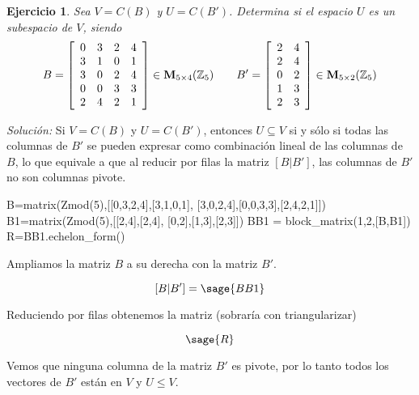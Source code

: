 \documentclass{amsart}
\newtheorem{ejer}{Ejercicio}
\begin{document}

\begin{ejer} Sea $V = C(B)$ y $U = C(B')$. Determina si el espacio $U$ es un subespacio de $V$, siendo 
\[B = \left[\begin{array}{rrrrr}
0 & 3 & 2 & 4 \\
3 & 1 & 0 & 1 \\
3 & 0 & 2 & 4 \\
0 & 0 & 3 & 3 \\
2 & 4 & 2 & 1
\end{array}\right] \in {\bf M}_{5 \times 4}({\mathbb Z}_{5}) \qquad
B' = \left[\begin{array}{rrrrr}
2 & 4 \\
2 & 4 \\
0 & 2 \\
1 & 3 \\
2 & 3
\end{array}\right] \in {\bf M}_{5 \times 2}({\mathbb Z}_{5}) \]
\end{ejer}

{\it Soluci\'on:}
Si $V=C(B)$ y $U=C(B')$, entonces $U\subseteq V$ si y sólo si todas las columnas 
de $B'$ se pueden expresar como combinación lineal de las columnas de $B$, lo 
que equivale a que al reducir por filas la matriz $[B|B']$, las columnas de $B'$ 
no son columnas pivote.

\begin{sageblock}
B=matrix(Zmod(5),[[0,3,2,4],[3,1,0,1],
[3,0,2,4],[0,0,3,3],[2,4,2,1]])
B1=matrix(Zmod(5),[[2,4],[2,4],
[0,2],[1,3],[2,3]])
BB1 = block_matrix(1,2,[B,B1])
R=BB1.echelon_form()
\end{sageblock}

Ampliamos la matriz $B$ a su derecha con la matriz $B'$.

$$ [B|B'] = \sage{BB1} $$

Reduciendo por filas obtenemos la matriz (sobraría con triangularizar)

$$ \sage{R} $$

Vemos que ninguna columna de la matriz $B'$ es pivote, por lo tanto todos los 
vectores de $B'$ están en $V$ y $U \leq V$.

\end{document}
